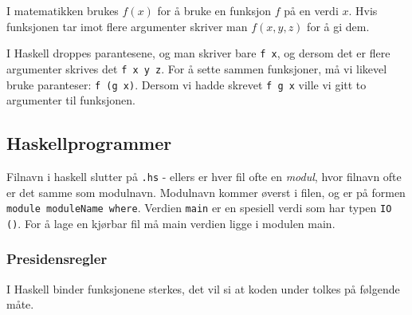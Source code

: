 \documentclass[twocolumn]{article}
\begin{document}
I matematikken brukes \( f\left( x \right) \) for å bruke en funksjon \( f \) på en verdi \( x \). Hvis funksjonen tar imot flere argumenter skriver man \( f\left(x,y,z\right) \) for å gi dem.
\bigskip

I Haskell droppes parantesene, og man skriver bare \verb!f x!, og dersom det er flere argumenter skrives det \verb!f x y z!. For å sette sammen funksjoner, må vi likevel bruke paranteser: \verb!f (g x)!. Dersom vi hadde skrevet \verb!f g x! ville vi gitt to argumenter til funksjonen.

\subsection{Haskellprogrammer}
Filnavn i haskell slutter på \verb!.hs! - ellers er hver fil ofte en \textit{modul}, hvor filnavn ofte er det samme som modulnavn. Modulnavn kommer øverst i filen, og er på formen \verb!module moduleName where!. Verdien \verb!main! er en spesiell verdi som har typen \verb!IO ()!. For å lage en kjørbar fil må main verdien ligge i modulen main.

\subsubsection{Presidensregler}
I Haskell binder funksjonene sterkes, det vil si at koden under tolkes på følgende måte.



\end{document}
